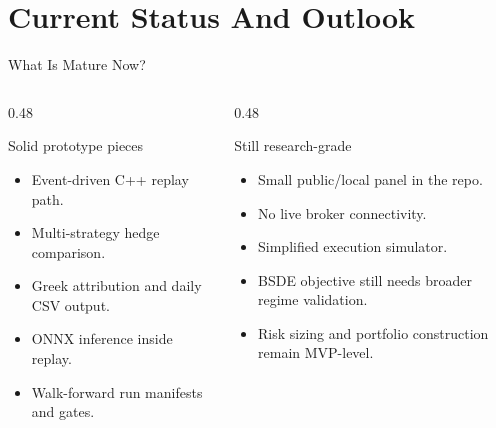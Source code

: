 \documentclass[11pt,aspectratio=169]{beamer}
\newcommand{\1}{\mathbf{1}}
\begin{document}
\section{Current Status And Outlook}

\begin{frame}{What Is Mature Now?}
    \small
    \begin{columns}[T,onlytextwidth]
    \begin{column}{0.48\textwidth}
    \begin{block}{Solid prototype pieces}
    \begin{itemize}
        \item Event-driven C++ replay path.
        \item Multi-strategy hedge comparison.
        \item Greek attribution and daily CSV output.
        \item ONNX inference inside replay.
        \item Walk-forward run manifests and gates.
    \end{itemize}
    \end{block}
    \end{column}
    \begin{column}{0.48\textwidth}
    \begin{alertblock}{Still research-grade}
    \begin{itemize}
        \item Small public/local panel in the repo.
        \item No live broker connectivity.
        \item Simplified execution simulator.
        \item BSDE objective still needs broader regime validation.
        \item Risk sizing and portfolio construction remain MVP-level.
    \end{itemize}
    \end{alertblock}
    \end{column}
    \end{columns}
\end{frame}
\end{document}
